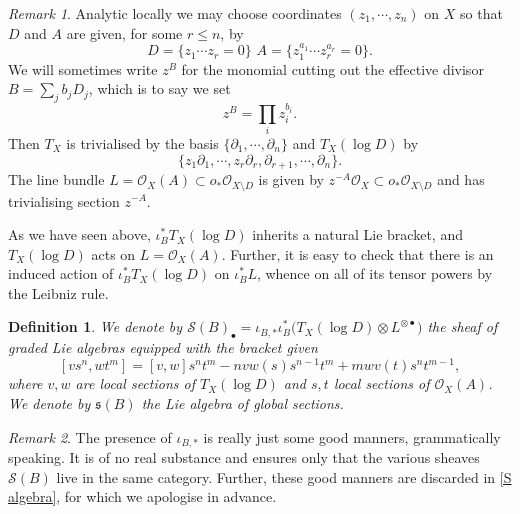 \documentclass[12pt, oneside]{amsart}       %
\newtheorem{definition}[theorem]{Definition}
\theoremstyle{remark}
\newtheorem*{remark}{Remark}
\renewcommand{\leq}{\leqslant}
\newcommand{\OO}{\mathcal{O}}
\begin{document}
\begin{remark}\label{coord} Analytic locally we may choose coordinates $(z_1,\cdots,z_n)$ on $X$ so that $D$ and $A$ are given, for some $r\leq n$, by $$D=\{z_1\cdots z_r=0\}\,\,A=\{z_1^{a_1}\cdots z_r^{a_r}=0\}.$$ We will sometimes write $z^B$ for the monomial cutting out the effective divisor $B=\sum_j b_jD_j$, which is to say we set $$z^B=\prod_i z_i^{b_i}.$$ Then $T_X$ is trivialised by the basis $\{\partial_1,\cdots,\partial_n\}$ and $T_X(\log D)$ by $$\{z_1\partial_1,\cdots,z_r\partial_r,\partial_{r+1},\cdots,\partial_n\}.$$ The line bundle $L=\OO_X(A)\subset o_*\OO_{X\setminus D}$ is given by $z^{-A}\OO_X\subset o_*\OO_{X\setminus D}$ and has trivialising section $z^{-A}.$ \end{remark}

As we have seen above, $\iota_B^*T_X(\log D)$ inherits a natural Lie bracket, and $T_X(\log D)$ acts on $L=\OO_X(A)$. Further, it is easy to check that there is an induced action of $\iota_B^*T_X(\log D)$ on $\iota_B^*L$, whence on all of its tensor powers by the Leibniz rule.


  \begin{definition} \label{Q(B) bracket def} We denote by $\mathcal{S}(B)_\bullet=\iota_{B,*}\iota_B^*\big(T_X(\log D)\otimes L^{\otimes\bullet}\big)$ the sheaf of graded Lie algebras equipped with the bracket given  $$[vs^{ n},wt^{ m}]=[v,w]s^{n}t^{m}-nvw(s)s^{n-1}t^{ m}+mwv(t)s^{ n}t^{m-1},$$ where $v,w$ are local sections of $T_X(\log D)$ and $s,t$ local sections of $\OO_X(A)$. We denote by $\mathfrak{s}(B)$ the Lie algebra of global sections. \end{definition}

\begin{remark} The presence of $\iota_{B,*}$ is really just some good manners, grammatically speaking. It is of no real substance and ensures only that the various sheaves $\mathcal{S}(B)$ live in the same category. Further, these good manners are discarded in \ref{S algebra}, for which we apologise in advance.  \end{remark}
\end{document}

